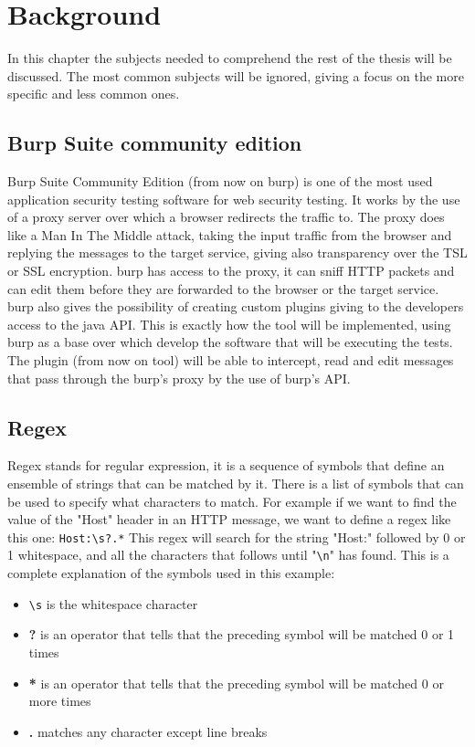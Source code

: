 \chapter{Background}
In this chapter the subjects needed to comprehend the rest of the thesis will be discussed. The most common subjects will be ignored, giving a focus on the more specific and less common ones.

\section{Burp Suite community edition}
Burp Suite Community Edition (from now on \Gls{burp}) is one of the most used application security testing software for web security testing. It works by the use of a proxy server over which a browser redirects the traffic to. The proxy does like a Man In The Middle attack, taking the input traffic from the browser and replying the messages to the target service, giving also transparency over the TSL or SSL encryption. \Gls{burp} has access to the proxy, it can sniff HTTP packets and can edit them before they are forwarded to the browser or the target service. \Gls{burp} also gives the possibility of creating custom plugins giving to the developers access to the java API. This is exactly how the tool will be implemented, using \Gls{burp} as a base over which develop the software that will be executing the tests. The plugin (from now on tool) will be able to intercept, read and edit messages that pass through the \Gls{burp}'s proxy by the use of \Gls{burp}'s API.

\section{Regex}
Regex stands for regular expression, it is a sequence of symbols that define an ensemble of strings that can be matched by it. There is a list of symbols that can be used to specify what characters to match. For example if we want to find the value of the "Host" header in an HTTP message, we want to define a regex like this one: \verb|Host:\s?.*|
This regex will search for the string "Host:" followed by 0 or 1 whitespace, and all the characters that follows until "\verb|\n|" has found. This is a complete explanation of the symbols used in this example:
\begin{itemize}
    \item \verb|\s| is the whitespace character
    \item \textbf{?} is an operator that tells that the preceding symbol will be matched 0 or 1 times
    \item \textbf{*} is an operator that tells that the preceding symbol will be matched 0 or more times
    \item \textbf{.} matches any character except line breaks
\end{itemize}

